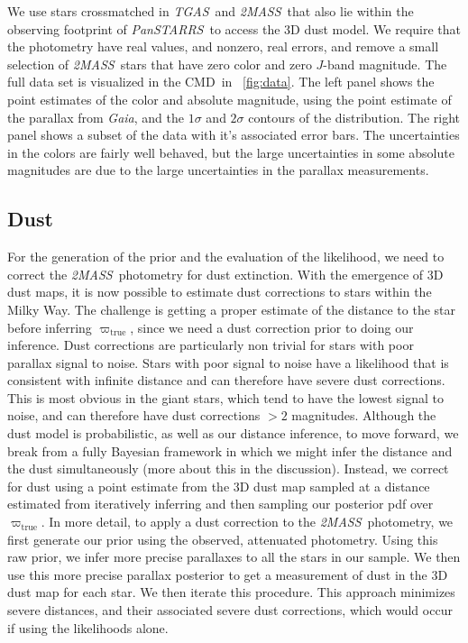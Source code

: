 \documentclass[modern]{aastex61}
\newcommand{\acronym}[1]{{\small{#1}}}
\newcommand{\project}[1]{\textsl{#1}}
\newcommand{\tgas}{\project{\acronym{TGAS}}}
\newcommand{\tmass}{\project{\acronym{2MASS}}}
\newcommand{\gaia}{\project{Gaia}}
\newcommand{\panstarrs}{\project{Pan\acronym{STARRS}}}
\newcommand{\cmd}{\acronym{CMD}}
\newcommand{\true}{\mathrm{true}}
\begin{document}
We use stars crossmatched in \tgas\ and \tmass\, that also lie within the
observing footprint of \panstarrs\ to access the \cite{green15} 3D dust model.
We require that the photometry have real values, and nonzero, real errors, and
remove a small selection of \tmass\ stars that have zero color and zero $J$-band
magnitude.
The full data set is visualized in the \cmd\ in \figurename~\ref{fig:data}.
The left panel shows the point estimates of the color and absolute magnitude,
using the point estimate of the parallax from \gaia, and the $1\sigma$ and
$2\sigma$ contours of the distribution.
The right panel shows a subset of the data with it's associated error bars.
The uncertainties in the colors are fairly well behaved, but the large
uncertainties in some absolute magnitudes are due to the large uncertainties in
the parallax measurements.

\subsection{Dust}

For the generation of the prior and the evaluation of the likelihood, we need to
correct the \tmass\ photometry for dust extinction.
With the emergence of 3D dust maps, it is now possible to estimate dust
corrections to stars within the Milky Way. The challenge is getting a
proper estimate of the distance to the star before inferring
$\varpi_{\true}$, since we need a dust correction prior to doing our
inference. Dust corrections are particularly non trivial for stars
with poor parallax signal to noise. Stars with poor signal to noise
have a likelihood that is consistent with infinite distance and can
therefore have severe dust corrections. This is most obvious in the
giant stars, which tend to have the lowest signal to noise, and can
therefore have dust corrections $> 2$ magnitudes. Although the dust
model is probabilistic, as well as our distance inference, to move
forward, we break from a fully Bayesian framework in which we might
infer the distance and the dust simultaneously (more about this in the
discussion). Instead, we correct for dust using a point estimate from
the 3D dust map \citep{green15} sampled at a distance estimated from
iteratively inferring and then sampling our posterior pdf over
$\varpi_{\true}$. In more detail, to apply a dust correction to the
\tmass\ photometry, we first generate our prior using the observed,
attenuated photometry. Using this raw prior, we infer more precise
parallaxes to all the stars in our sample. We then use this more
precise parallax posterior to get a measurement of dust in the 3D dust
map for each star. We then iterate this procedure. This approach minimizes severe
distances, and their associated severe dust corrections, which would
occur if using the likelihoods alone.
\end{document}
